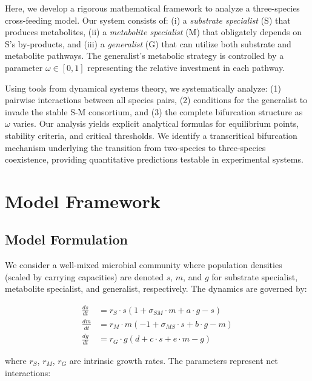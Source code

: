 \documentclass[11pt]{article}
\begin{document}
Here, we develop a rigorous mathematical framework to analyze a three-species cross-feeding model. Our system consists of: (i) a \textit{substrate specialist} (S) that produces metabolites, (ii) a \textit{metabolite specialist} (M) that obligately depends on S's by-products, and (iii) a \textit{generalist} (G) that can utilize both substrate and metabolite pathways. The generalist's metabolic strategy is controlled by a parameter $\omega \in [0,1]$ representing the relative investment in each pathway.

Using tools from dynamical systems theory, we systematically analyze: (1) pairwise interactions between all species pairs, (2) conditions for the generalist to invade the stable S-M consortium, and (3) the complete bifurcation structure as $\omega$ varies. Our analysis yields explicit analytical formulas for equilibrium points, stability criteria, and critical thresholds. We identify a transcritical bifurcation mechanism underlying the transition from two-species to three-species coexistence, providing quantitative predictions testable in experimental systems.

\section{Model Framework}

\subsection{Model Formulation}

We consider a well-mixed microbial community where population densities (scaled by carrying capacities) are denoted $s$, $m$, and $g$ for substrate specialist, metabolite specialist, and generalist, respectively. The dynamics are governed by:

\begin{align}
\frac{ds}{dt} &= r_S \cdot s \left(1 + \sigma_{SM} \cdot m + a \cdot g - s\right) \label{eq:s_dynamics}\\
\frac{dm}{dt} &= r_M \cdot m \left(-1 + \sigma_{MS} \cdot s + b \cdot g - m\right) \label{eq:m_dynamics}\\
\frac{dg}{dt} &= r_G \cdot g \left(d + c \cdot s + e \cdot m - g\right) \label{eq:g_dynamics}
\end{align}

where $r_S$, $r_M$, $r_G$ are intrinsic growth rates. The parameters represent net interactions:
\end{document}
